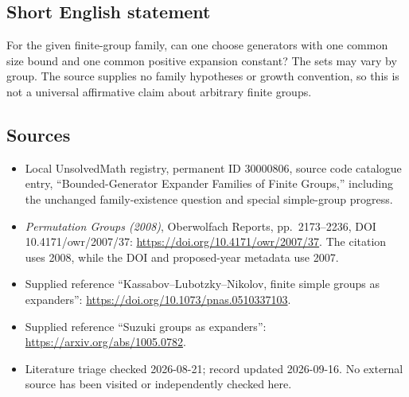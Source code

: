 \documentclass[11pt]{article}
\begin{document}
\subsection{Short English statement}
For the given finite-group family, can one choose generators with one common size bound and one common positive expansion constant? The sets may vary by group. The source supplies no family hypotheses or growth convention, so this is not a universal affirmative claim about arbitrary finite groups.
\subsection{Sources}
\begin{itemize}
\item Local UnsolvedMath registry, permanent ID 30000806, source code catalogue entry, ``Bounded-Generator Expander Families of Finite Groups,'' including the unchanged family-existence question and special simple-group progress.
\item \emph{Permutation Groups (2008)}, Oberwolfach Reports, pp.\ 2173--2236, DOI 10.4171/owr/2007/37: \url{https://doi.org/10.4171/owr/2007/37}. The citation uses 2008, while the DOI and proposed-year metadata use 2007.
\item Supplied reference ``Kassabov--Lubotzky--Nikolov, finite simple groups as expanders'': \url{https://doi.org/10.1073/pnas.0510337103}.
\item Supplied reference ``Suzuki groups as expanders'': \url{https://arxiv.org/abs/1005.0782}.
\item Literature triage checked 2026-08-21; record updated 2026-09-16. No external source has been visited or independently checked here.
\end{itemize}
\end{document}
